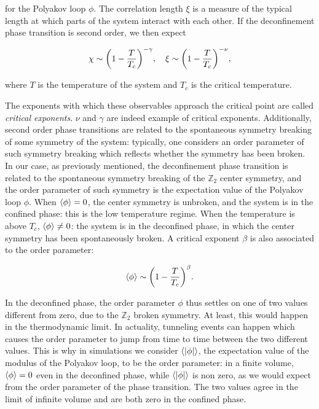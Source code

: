 \documentclass[reqno,12pt]{article}
\numberwithin{equation}{section}
\begin{document}
for the Polyakov loop $\phi$. The correlation length $\xi$ is a measure of the typical length at which parts of
the system interact with each other. If the deconfinement phase transition is second order, we then expect

\begin{equation}
	\chi \sim \qty(1 - \frac{T}{T_c})^{-\gamma} \qc \xi \sim \qty(1 - \frac{T}{T_c})^{-\nu},
\end{equation}

where $T$ is the temperature of the system and $T_c$ is the critical temperature.

The exponents with which these observables approach the critical point are called 
\textit{critical exponents}. $\nu$ and $\gamma$ are indeed example of critical exponents.
Additionally, second order phase transitions
are related to the spontaneous symmetry breaking of some symmetry of the system: typically, one considers an
order parameter of such symmetry breaking which reflects whether the symmetry has been broken. In our case,
as previously mentioned, the deconfinement
phase transition is related to the spontaneous symmetry breaking of the $\mathbb{Z}_2$ center symmetry, and the order 
parameter of such symmetry is the expectation value of the Polyakov loop $\phi$. When $\expval{\phi} = 0$, 
the center symmetry is unbroken, and the system is in the confined phase: this is the low temperature regime. When
the temperature is above $T_c$, $\expval{\phi} \ne 0$: the system is in the deconfined phase, in which the
center symmetry has been spontaneously broken. A critical exponent $\beta$ is also associated to the order parameter:

\begin{equation}
	\expval{\phi} \sim \qty(1 - \frac{T}{T_c})^\beta.
\end{equation}

In the deconfined phase, the order parameter $\phi$ thus settles on one of two values different from zero, due to
the $\mathbb{Z}_2$ broken symmetry. At least, this would happen in the thermodynamic limit. In actuality, tunneling events
can happen which causes the order parameter to jump from time to time between the two different values. This is
why in simulations we consider $\expval{|\phi|}$, the expectation value of the modulus of the Polyakov loop, to be the
order parameter: in a finite volume, $\expval{\phi} = 0$ even in the deconfined phase, while $\expval{|\phi|}$ is
non zero, as we would expect from the order parameter of the phase transition. 
The two values agree in the limit of infinite volume and are both zero in the confined phase. 
\end{document}
